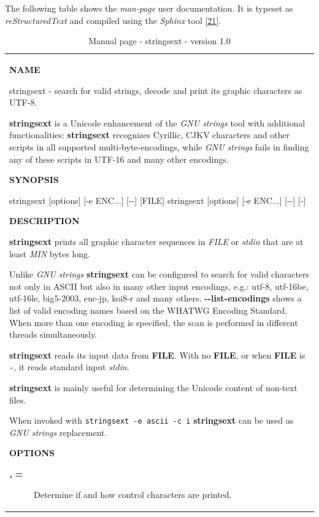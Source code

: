 The following table shows the \emph{man-page} user documentation. It is
typeset as \emph{reStructuredText} and compiled using the \emph{Sphinx}
tool {[}\protect\hyperlink{lehmann2011}{21}{]}.

\begin{longtable}[]{@{}l@{}}
\caption{Manual page - stringsext - version 1.0}\tabularnewline
\toprule
\begin{minipage}[t]{0.97\columnwidth}\raggedright\strut
\textbf{NAME}

stringsext - search for valid strings, decode and print its graphic
characters as UTF-8.

\textbf{stringsext} is a Unicode enhancement of the \emph{GNU strings}
tool with additional functionalities: \textbf{stringsext} recognizes
Cyrillic, CJKV characters and other scripts in all supported
multi-byte-encodings, while \emph{GNU strings} fails in finding any of
these scripts in UTF-16 and many other encodings.

\textbf{SYNOPSIS}

stringsext {[}options{]} {[}-e ENC...{]} {[}-\/-{]} {[}FILE{]}
stringsext {[}options{]} {[}-e ENC...{]} {[}-\/-{]} {[}-{]}

\textbf{DESCRIPTION}

\textbf{stringsext} prints all graphic character sequences in
\emph{FILE} or \emph{stdin} that are at least \emph{MIN} bytes long.

Unlike \emph{GNU strings} \textbf{stringsext} can be configured to
search for valid characters not only in ASCII but also in many other
input encodings, e.g.: utf-8, utf-16be, utf-16le, big5-2003, euc-jp,
koi8-r and many others. \textbf{-\/-list-encodings} shows a list of
valid encoding names based on the WHATWG Encoding Standard. When more
than one encoding is specified, the scan is performed in different
threads simultaneously.

\textbf{stringsext} reads its input data from \textbf{FILE}. With no
\textbf{FILE}, or when \textbf{FILE} is \texttt{-}, it reads standard
input \emph{stdin}.

\textbf{stringsext} is mainly useful for determining the Unicode content
of non-text files.

When invoked with \texttt{stringsext\ -e\ ascii\ -c\ i}
\textbf{stringsext} can be used as \emph{GNU strings} replacement.

\textbf{OPTIONS}

\begin{description}
\item[\textbf{-c} \emph{MODE}, \textbf{-\/-control-chars}=\emph{MODE}]
Determine if and how control characters are printed.


\end{description}
\end{minipage}
\end{longtable}
